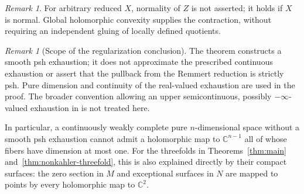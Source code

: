 \documentclass[11pt]{amsart}
\theoremstyle{definition}
\theoremstyle{remark}
\newtheorem{remark}[theorem]{Remark}
\numberwithin{equation}{section}
\newcommand{\C}{\mathbb C}
\begin{document}
\begin{remark}
For arbitrary reduced \(X\), normality of \(Z\) is not asserted;
it holds if \(X\) is normal.
Global holomorphic convexity supplies the contraction, without
requiring an independent gluing of locally defined quotients.
\end{remark}

\begin{remark}[Scope of the regularization conclusion]
The theorem constructs a smooth psh exhaustion; it does not
approximate the prescribed continuous exhaustion or assert that
the pullback from the Remmert reduction is strictly psh.
Pure dimension and continuity of the real-valued exhaustion are used
in the proof.  The broader convention allowing an upper
semicontinuous, possibly \(-\infty\)-valued exhaustion in
\cite{Vajaitu2022} is not treated here.
\end{remark}

In particular, a continuously weakly complete pure \(n\)-dimensional
space without a smooth psh exhaustion cannot admit a holomorphic
map to \(\C^{n-1}\) all of whose fibers have dimension at most one.
For the threefolds in Theorems~\ref{thm:main}
and~\ref{thm:nonkahler-threefold}, this is also explained directly
by their compact surfaces: the zero section in \(M\) and exceptional
surfaces in \(N\) are mapped to points by every holomorphic map to
\(\C^2\).
\end{document}
